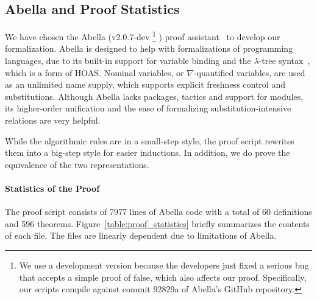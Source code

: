 \subsection{Abella and Proof Statistics}

We have chosen the Abella (v2.0.7-dev
\footnote{We use a development version because the developers
just fixed a serious bug that accepts a simple proof of false,
which also affects our proof.
Specifically, our scripts compile against commit 92829a of Abella's GitHub repository.}
) proof assistant~\cite{AbellaDesc} to develop our formalization.
Abella is designed to help with formalizations of programming languages,
due to its built-in support for variable binding and
the $\lambda$-tree syntax~\cite{miller2000abstract}, which is a form of HOAS.
Nominal variables, or $\nabla$-quantified variables, are used as an unlimited name supply,
which supports explicit freshness control and substitutions.
Although Abella lacks packages, tactics and support for modules,
its higher-order unification and the ease of formalizing substitution-intensive relations
are very helpful.

While the algorithmic rules are in a small-step style,
the proof script rewrites them into a big-step style
for easier inductions.
In addition, we do prove the equivalence of the two representations.

\paragraph{Statistics of the Proof}
The proof script consists of 7977 lines of Abella code with a total of
60 definitions and 596 theorems.
Figure~\ref{table:proof_statistics} briefly summarizes the contents of each file.
The files are linearly dependent due to limitations of Abella.

